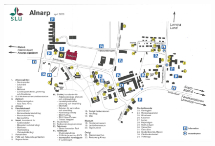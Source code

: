 \begin{figure}
    \centering
        \includegraphics[scale=0.5]{images/CampusAlnarp.png}
\end{figure}